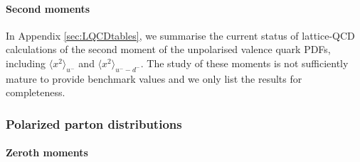 \paragraph{Second moments}
In Appendix \ref{sec:LQCDtables}, we summarise the current status of lattice-QCD calculations of the second moment of 
the unpolarised valence quark PDFs, including $\langle x^2 \rangle_{u^-}$ and $\langle x^2\rangle_{u^--d^-}$. 
The study of these moments is not sufficiently mature to provide benchmark values and we only list the results for completeness.

\subsubsection{Polarized parton distributions}

\paragraph{Zeroth moments}

